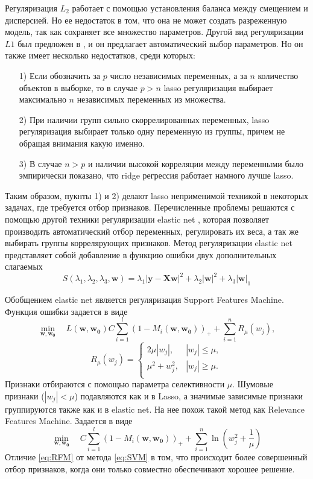 \documentclass[12pt, twoside]{article}
\newcommand{\xmatr}{{\mathbf{X}}}
\newcommand{\yb}{{\mathbf{y}}}
\newcommand{\wm}{{\mathbf{w}}}
\begin{document}
Регуляризация $L_2$ работает с помощью установления баланса между смещением и дисперсией. Но ее недостаток в том, что она не может создать разреженную модель, так как сохраняет все множество параметров. Другой вид регуляризации $L1$ был предложен в \cite{tibshirani1996regression}, и он предлагает автоматический выбор параметров. Но он также имеет несколько недостатков, среди которых:
\begin{enumerate}
\item[1)]
Если обозначить за $p$ число независимых переменных, а за $n$ количество объектов в выборке, то в случае $p>n$ lasso регуляризация выбирает максимально $n$ независимых переменных из множества.
\item[2)]
При наличии групп сильно скоррелированных переменных, lasso регуляризация выбирает только одну переменную из группы, причем не обращая внимания какую именно.
\item[3)]
В случае $n>p$ и наличии высокой корреляции между переменными было эмпирически показано, что ridge регрессия работает намного лучше lasso.
\end{enumerate}
Таким образом, пукнты 1) и 2) делают lasso неприменимой техникой в некоторых задачах, где требуется отбор признаков. Перечисленные проблемы решаются с помощью другой техники регуляризации elastic net \cite{zou2005regularization}, которая позволяет производить автоматический отбор переменных, регулировать их веса, а так же выбирать группы коррелярующих признаков. Метод регуляризации elastic net представляет собой добавление в функцию ошибки двух дополнительных слагаемых
\begin{equation}
S(\lambda_1,\lambda_2,\lambda_3,\wm) = \lambda_1|\yb-\xmatr\wm|^2+\lambda_2|\wm|^2+\lambda_3|\wm|_1
\end{equation}

Обобщением elastic net является регуляризация Support Features Machine. Функция ошибки  задается в виде
\begin{equation}\label{eq:SVM}
\underset{\mathbf{w},\mathbf{w_0}}\min\quad L (\wm, \mathbf{w_0}) C\sum_{i=1}^l(1 - M_i(\mathbf{w},\mathbf{w_0}))_+ + \sum_{i=1}^nR_{\mu}(w_j),
\end{equation}
\begin{equation}
R_{\mu}(w_j) = \begin{cases}
2\mu|w_j|,& |w_j| \leq \mu, \\
\mu^2 + w_j^2,& |w_j| \geq \mu. \\
\end{cases}
\end{equation}
Признаки отбираются с помощью параметра селективности $\mu$. Шумовые признаки ($|w_j| < \mu$) подавляются как и в Lasso, а значимые зависимые признаки группируются также как и в elastic net.
На нее похож такой метод как Relevance Features Machine. Задается в виде
\begin{equation}\label{eq:RFM}
\underset{\mathbf{w},\mathbf{w_0}}\min\quad C\sum_{i=1}^l(1 - M_i(\mathbf{w},\mathbf{w_0}))_+ + \sum_{i=1}^n\ln(w_j^2 + \frac{1}{\mu})
\end{equation}
Отличие \eqref{eq:RFM} от метода \eqref{eq:SVM} в том, что происходит более совершенный отбор признаков, когда они только совместно обеспечивают хорошее решение.
\end{document}

